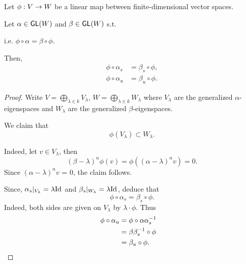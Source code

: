 \begin{lemma}
Let $\phi : V \overset{}{\rightarrow} W$ be a linear map between finite-dimensional vector spaces.

Let $\alpha \in \textsf{GL}(W)$ and $\beta \in \textsf{GL}(W)$ s.t.
\begin{center}
\end{center}
i.e. $\phi \circ \alpha = \beta \circ \phi$.

Then,
\begin{align*}
\phi \circ \alpha_s &= \beta_s \circ \phi,\\
\phi \circ \alpha_u &= \beta_u \circ \phi.
\end{align*}
\end{lemma}
\begin{proof}
Write $V = \bigoplus_{\lambda \in k} V_\lambda$, $W = \bigoplus_{\lambda \in k} W_\lambda$ where $V_\lambda$ are the generalized $\alpha$-eigenspaces and $W_\lambda$ are the generalized $\beta$-eigenspaces.

We claim that
\[ \phi (V_\lambda) \subset W_\lambda. \]

Indeed, let $v \in V_\lambda$, then
\[(\beta-\lambda)^n\phi(v) = \phi((\alpha-\lambda)^n v) = 0.\]
Since $(\alpha-\lambda)^n v$ = 0, the claim follows.

Since, $\alpha_s|_{V_\lambda} = \lambda \text{Id}_{}$ and $\beta_s |_{W_\lambda} = \lambda \text{Id}_{}$, deduce that
\[ \phi \circ \alpha_s = \beta_s \circ \phi. \]
Indeed, both sides are given on $V_\lambda$ by $\lambda \cdot \phi$. Thus
\begin{align*}
\phi \circ \alpha_u &= \phi \circ \alpha\alpha_s^{-1}\\
&= \beta \beta_s^{-1} \circ \phi\\
&= \beta_u \circ \phi. \tag*{\qedhere} 
\end{align*} 
\end{proof}

